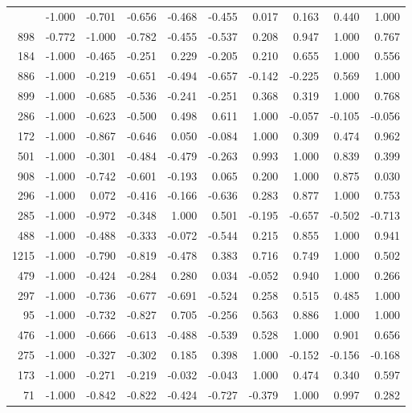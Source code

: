 \begin{longtable}{rrrrrrrrrr}
\bottomrule
\endlastfoot
   491 & -1.000 & -0.701 & -0.656 & -0.468 & -0.455 &  0.017 &  0.163 &  0.440 &  1.000 \\
   898 & -0.772 & -1.000 & -0.782 & -0.455 & -0.537 &  0.208 &  0.947 &  1.000 &  0.767 \\
   184 & -1.000 & -0.465 & -0.251 &  0.229 & -0.205 &  0.210 &  0.655 &  1.000 &  0.556 \\
   886 & -1.000 & -0.219 & -0.651 & -0.494 & -0.657 & -0.142 & -0.225 &  0.569 &  1.000 \\
   899 & -1.000 & -0.685 & -0.536 & -0.241 & -0.251 &  0.368 &  0.319 &  1.000 &  0.768 \\
   286 & -1.000 & -0.623 & -0.500 &  0.498 &  0.611 &  1.000 & -0.057 & -0.105 & -0.056 \\
   172 & -1.000 & -0.867 & -0.646 &  0.050 & -0.084 &  1.000 &  0.309 &  0.474 &  0.962 \\
   501 & -1.000 & -0.301 & -0.484 & -0.479 & -0.263 &  0.993 &  1.000 &  0.839 &  0.399 \\
   908 & -1.000 & -0.742 & -0.601 & -0.193 &  0.065 &  0.200 &  1.000 &  0.875 &  0.030 \\
   296 & -1.000 &  0.072 & -0.416 & -0.166 & -0.636 &  0.283 &  0.877 &  1.000 &  0.753 \\
   285 & -1.000 & -0.972 & -0.348 &  1.000 &  0.501 & -0.195 & -0.657 & -0.502 & -0.713 \\
   488 & -1.000 & -0.488 & -0.333 & -0.072 & -0.544 &  0.215 &  0.855 &  1.000 &  0.941 \\
  1215 & -1.000 & -0.790 & -0.819 & -0.478 &  0.383 &  0.716 &  0.749 &  1.000 &  0.502 \\
   479 & -1.000 & -0.424 & -0.284 &  0.280 &  0.034 & -0.052 &  0.940 &  1.000 &  0.266 \\
   297 & -1.000 & -0.736 & -0.677 & -0.691 & -0.524 &  0.258 &  0.515 &  0.485 &  1.000 \\
    95 & -1.000 & -0.732 & -0.827 &  0.705 & -0.256 &  0.563 &  0.886 &  1.000 &  1.000 \\
   476 & -1.000 & -0.666 & -0.613 & -0.488 & -0.539 &  0.528 &  1.000 &  0.901 &  0.656 \\
   275 & -1.000 & -0.327 & -0.302 &  0.185 &  0.398 &  1.000 & -0.152 & -0.156 & -0.168 \\
   173 & -1.000 & -0.271 & -0.219 & -0.032 & -0.043 &  1.000 &  0.474 &  0.340 &  0.597 \\
    71 & -1.000 & -0.842 & -0.822 & -0.424 & -0.727 & -0.379 &  1.000 &  0.997 &  0.282 \\

\end{longtable}
